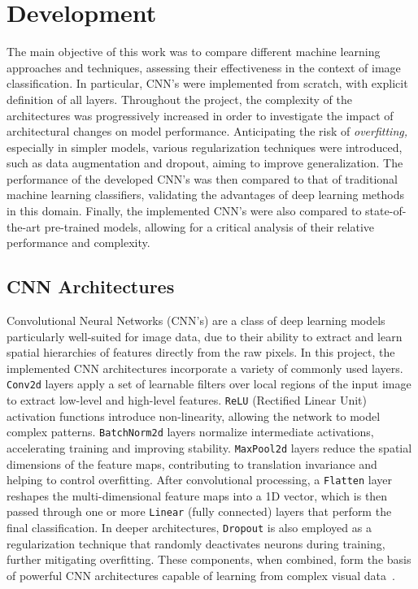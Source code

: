 \documentclass[journal,article,submit,pdftex,moreauthors]{Definitions/mdpi}
\begin{document}
\section{Development}

The main objective of this work was to compare different machine learning approaches and techniques, assessing their effectiveness in the context of image classification. In particular, CNN's were implemented from scratch, with explicit definition of all layers. Throughout the project, the complexity of the architectures was progressively increased in order to investigate the impact of architectural changes on model performance. Anticipating the risk of \textit{overfitting,} especially in simpler models, various regularization techniques were introduced, such as data augmentation and dropout, aiming to improve generalization. The performance of the developed CNN's was then compared to that of traditional machine learning classifiers, validating the advantages of deep learning methods in this domain. Finally, the implemented CNN's were also compared to state-of-the-art pre-trained models, allowing for a critical analysis of their relative performance and complexity.

\subsection{CNN Architectures}
Convolutional Neural Networks (CNN's) are a class of deep learning models particularly well-suited for image data, due to their ability to extract and learn spatial hierarchies of features directly from the raw pixels. In this project, the implemented CNN architectures incorporate a variety of commonly used layers. \texttt{Conv2d} layers apply a set of learnable filters over local regions of the input image to extract low-level and high-level features. \texttt{ReLU} (Rectified Linear Unit) activation functions introduce non-linearity, allowing the network to model complex patterns. \texttt{BatchNorm2d} layers normalize intermediate activations, accelerating training and improving stability. \texttt{MaxPool2d} layers reduce the spatial dimensions of the feature maps, contributing to translation invariance and helping to control overfitting. After convolutional processing, a \texttt{Flatten} layer reshapes the multi-dimensional feature maps into a 1D vector, which is then passed through one or more \texttt{Linear} (fully connected) layers that perform the final classification. In deeper architectures, \texttt{Dropout} is also employed as a regularization technique that randomly deactivates neurons during training, further mitigating overfitting. These components, when combined, form the basis of powerful CNN architectures capable of learning from complex visual data~\cite{gfg_cnn_intro}.
\end{document}
